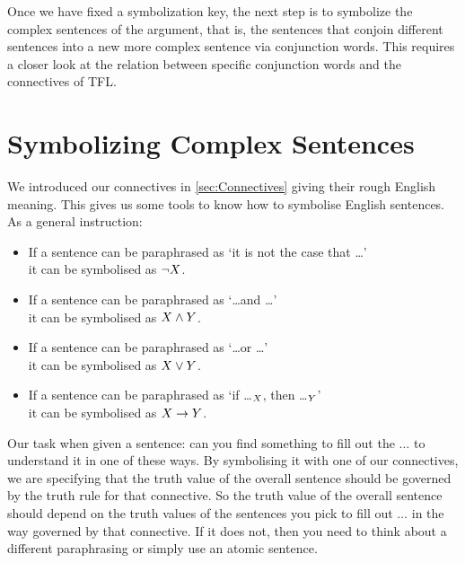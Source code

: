 Once we have fixed a symbolization key, the next step is to symbolize the complex sentences of the argument, that is, the sentences that conjoin different sentences into a new more complex sentence via conjunction words. This requires a closer look at the relation between specific conjunction words and the connectives of TFL.


\section{Symbolizing Complex Sentences}\label{sec:SymbolisingTFL - simple connectives complex form}
We introduced our connectives in \cref{sec:Connectives} giving their rough English meaning. This gives us some tools to know how to symbolise English sentences. 
As a general instruction:
	\begin{itemize}
		\item If a sentence can be paraphrased as `it is not the case that \ldots'\\ it can be symbolised as $\neg X$.
		\item If a sentence can be paraphrased as `\ldots and \ldots'\\ it can be symbolised as $X\mathbin{\wedge} Y$.
		\item If a sentence can be paraphrased as `\ldots or \ldots'\\ it can be symbolised as $X\vee Y$.
		\item If a sentence can be paraphrased as `if \ldots$_X$, then \ldots$_Y$'\\ it can be symbolised as $X\rightarrow Y$.
	\end{itemize}
	
	Our task when given a sentence: can you find something to fill out the $\ldots$ to understand it in one of these ways. 
	By symbolising it with one of our connectives, we are specifying that the truth value of the overall sentence should be governed by the truth rule for that connective. So the truth value of the overall sentence should depend on the truth values of the sentences you pick to fill out $\ldots$ in the way governed by that connective. If it does not, then you need to think about a different paraphrasing or simply use an atomic sentence. 

